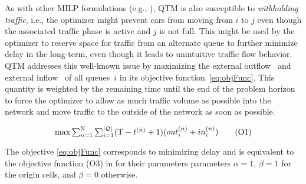 As with other MILP formulations (e.g., ), QTM is also
susceptible to \emph{withholding traffic}, i.e., the optimizer might prevent
cars from moving from $i$ to $j$ even though the associated traffic phase is
active and $j$ is not full.
%
This might be used by the optimizer to reserve space for traffic from an
alternate queue to further minimize delay in the long-term, even though it leads
to unintuitive traffic flow behavior.
%
QTM addresses this well-known issue by maximizing the external outflow~
%
%
and external inflow~ of all queues~$i$ in its objective
function~\eqref{eq:objFunc}.
%
This quantity is weighted by the remaining time until the end of the problem
horizon \TMAX to force the optimizer to allow as much traffic volume as possible
into the network and move traffic to the outside of the network as soon as
possible.

\vspace{-3mm}

\begin{equation}
\textstyle \max 
 \sum_{n=1}^{\mathrm{N}} \sum_{i=1}^{|\mathcal{\mathcal{Q}}|} (\mathrm{T} - t^{(n)} + 1) (out_{i}^{(n)} + in_{i}^{(n)})
\tag{O1}\label{eq:objFunc}
\end{equation}




The objective \eqref{eq:objFunc} corresponds to minimizing delay 
and is equivalent to the objective function (O3) in
 for their parameters
parameters $\alpha = 1$, $\beta = 1$ for the origin cells, and
$\beta = 0$ otherwise.

%
%



